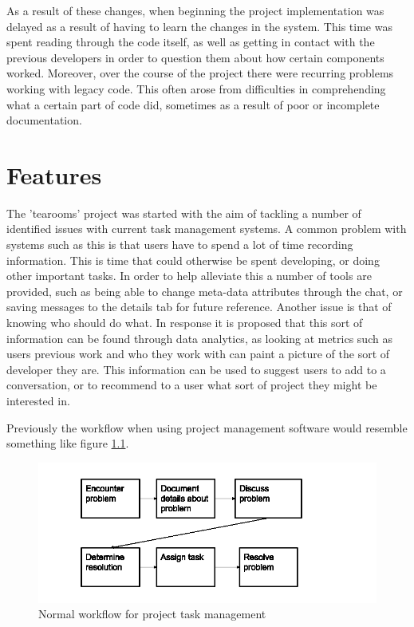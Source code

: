 \documentclass{l4proj}
\begin{document}
As a result of these changes, when beginning the project implementation was delayed as a result of having to learn the changes in the system.  This time was spent reading through the code itself, as well as getting in contact with the previous developers in order to question them about how certain components worked.  Moreover, over the course of the project there were recurring problems working with legacy code.  This often arose from difficulties in comprehending what a certain part of code did, sometimes as a result of poor or incomplete documentation.

\chapter{Features}

The 'tearooms' project was started with the aim of tackling a number of identified issues with current task management systems. A common problem with systems such as this is that users have to spend a lot of time recording information.  This is time that could otherwise be spent developing, or doing other important tasks.  In order to help alleviate this a number of tools are provided, such as being able to change meta-data attributes through the chat, or saving messages to the details tab for future reference.   Another issue is that of knowing who should do what.  In response it is proposed that this sort of information can be found through data analytics, as looking at metrics such as users previous work and who they work with can paint a picture of the sort of developer they are.  This information can be used to suggest users to add to a conversation, or to recommend to a user what sort of project they might be interested in.

Previously the workflow when using project management software would resemble something like figure \ref{fig:1}.  


\begin{figure}[h]
\includegraphics[scale=0.75]{old-workflow.png}
\centering
\caption{Normal workflow for project task management}
\label{fig:1}
\end{figure}
\newpage
\end{document}

